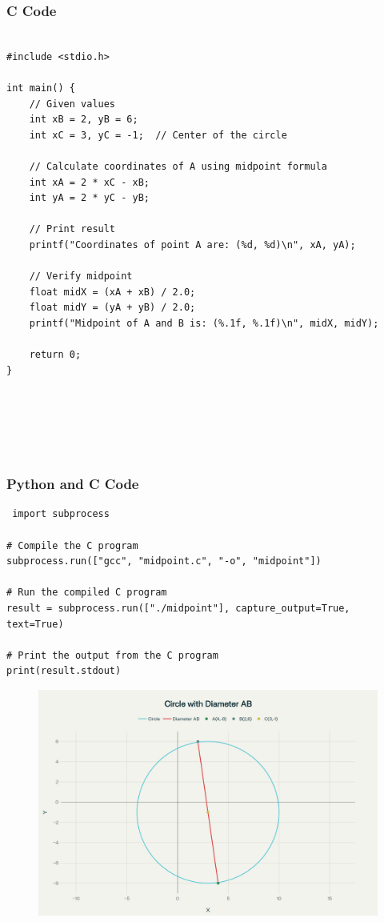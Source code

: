 \documentclass{beamer}
\begin{document}
 



 


\begin{frame}[fragile]
\frametitle{C Code}
\begin{lstlisting}
  
#include <stdio.h>

int main() {
    // Given values
    int xB = 2, yB = 6;
    int xC = 3, yC = -1;  // Center of the circle

    // Calculate coordinates of A using midpoint formula
    int xA = 2 * xC - xB;
    int yA = 2 * yC - yB;

    // Print result
    printf("Coordinates of point A are: (%d, %d)\n", xA, yA);

    // Verify midpoint
    float midX = (xA + xB) / 2.0;
    float midY = (yA + yB) / 2.0;
    printf("Midpoint of A and B is: (%.1f, %.1f)\n", midX, midY);

    return 0;
}






\end{lstlisting}

\end{frame}


\begin{frame}[fragile]
\frametitle{Python and C Code}

\begin{lstlisting}
 import subprocess

# Compile the C program
subprocess.run(["gcc", "midpoint.c", "-o", "midpoint"])

# Run the compiled C program
result = subprocess.run(["./midpoint"], capture_output=True, text=True)

# Print the output from the C program 
print(result.stdout)
\end{lstlisting}

\end{frame}

\begin{figure}[H]
    \centering
    \includegraphics[width=0.5\linewidth]{beamer/fig.png}
    \caption{}
    \label{fig:placeholder}
\end{figure} 
\end{document}
